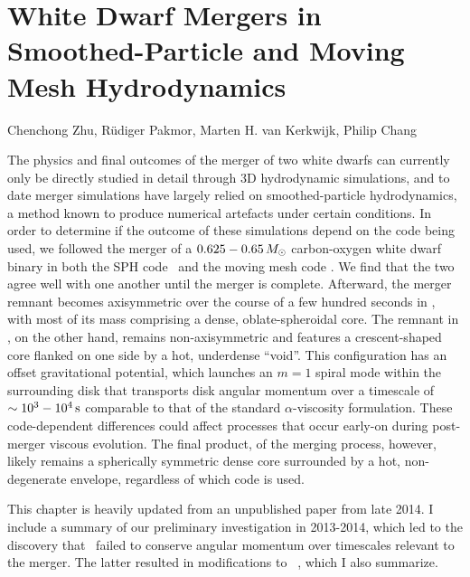\chapter{White Dwarf Mergers in Smoothed-Particle and Moving Mesh Hydrodynamics}
\label{ch:ch3}

\begin{center}
\begin{minipage}[c]{4.75in}
Chenchong Zhu, R\"{u}diger Pakmor, Marten H. van Kerkwijk, Philip Chang\\
\vspace{2em}
\end{minipage}
\end{center}

The physics and final outcomes of the merger of two white dwarfs can currently only be directly studied in detail through 3D hydrodynamic simulations, and to date merger simulations have largely relied on smoothed-particle hydrodynamics, a method known to produce numerical artefacts under certain conditions.  In order to determine if the outcome of these simulations depend on the code being used, we followed the merger of a $0.625 - 0.65\,\Msun$ carbon-oxygen white dwarf binary in both the SPH code \gasoline\ and the moving mesh code \arepo.  We find that the two agree well with one another until the merger is complete.  Afterward, the merger remnant becomes axisymmetric over the course of a few hundred seconds in \gasoline, with most of its mass comprising a dense, oblate-spheroidal core.  The remnant in \arepo, on the other hand, remains non-axisymmetric and features a crescent-shaped core flanked on one side by a hot, underdense ``void''.  This configuration has an offset gravitational potential, which launches an $m = 1$ spiral mode within the surrounding disk that transports disk angular momentum over a timescale of $\sim10^3-10^4\,\mathrm{s}$ comparable to that of the standard $\alpha$-viscosity formulation.  These code-dependent differences could affect processes that occur early-on during post-merger viscous evolution.  The final product, of the merging process, however, likely remains a spherically symmetric dense core surrounded by a hot, non-degenerate envelope, regardless of which code is used.

This chapter is heavily updated from an unpublished paper from late 2014.  I include a summary of our preliminary investigation in 2013-2014, which led to the discovery that \arepo\ failed to conserve angular momentum over timescales relevant to the merger.  The latter resulted in modifications to \arepo\ \citep{pakm+16}, which I also summarize.


